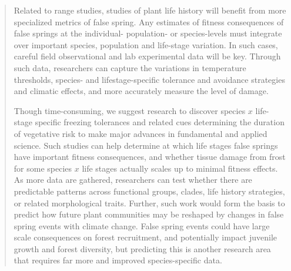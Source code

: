 \documentclass[11pt,a4paper]{article}
\begin{document}
\begin{quotation}
Related to range studies, studies of plant life history will benefit from more specialized metrics of false spring. Any estimates of fitness consequences of false springs at the individual- population- or species-levels must integrate over important species, population and life-stage variation. In such cases, careful field observational and lab experimental data will be key. Through such data, researchers can capture the variations in temperature thresholds, species- and lifestage-specific tolerance and avoidance strategies and climatic effects, and more accurately measure the level of damage.  

Though time-consuming, we suggest research to discover species \(x\) life-stage specific freezing tolerances and related cues determining the duration of vegetative risk %
to make major advances in fundamental and applied science. Such studies can help determine at which life stages false springs have important fitness consequences, and whether tissue damage from frost for some species \(x\) life stages actually scales up to minimal fitness effects. As more data are gathered, researchers can test whether there are predictable patterns across functional groups, clades, life history strategies, or related morphological traits. Further, such work would form the basis to predict how future plant communities may be reshaped by changes in false spring events with climate change. False spring events could have large scale consequences on forest recruitment, and potentially impact juvenile growth and forest diversity, but predicting this is another research area that requires far more and improved species-specific data. 


\end{quotation}
\end{document}

